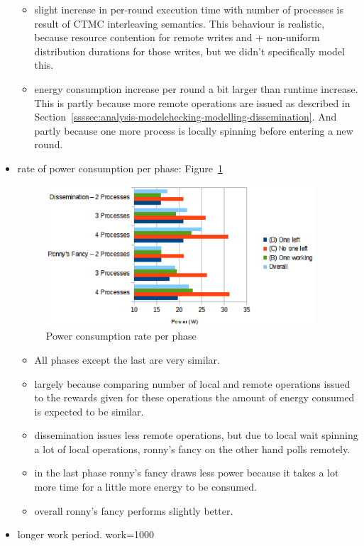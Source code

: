\documentclass[a4paper, 10pt]{article}
\begin{document}
\begin{itemize}
\begin{itemize}
			\item slight increase in per-round execution time with number of processes is result of CTMC interleaving semantics. This behaviour is realistic, because resource contention for remote writes and + non-uniform distribution durations for those writes, but we didn't specifically model this.
			\item energy consumption increase per round a bit larger than runtime increase. This is partly because more remote operations are issued as described in Section~\ref{ssssec:analysis-modelchecking-modelling-dissemination}. And partly because one more process is locally spinning before entering a new round.
		\end{itemize}
	\item rate of power consumption per phase: Figure~\ref{fig:df-power-work-100}
		\begin{figure}[htbp]
			\centering
			\includegraphics[width=10cm]{charts/df-power-work-100}
			\caption{Power consumption rate per phase}
			\label{fig:df-power-work-100}
		\end{figure}
		\begin{itemize}
			\item All phases except the last are very similar.
			\item largely because comparing number of local and remote operations issued to the rewards given for these operations the amount of energy consumed is expected to be similar.
			\item dissemination issues less remote operations, but due to local wait spinning a lot of local operations, ronny's fancy on the other hand polls remotely.
			\item in the last phase ronny's fancy draws less power because it takes a lot more time for a little more energy to be consumed.
			\item overall ronny's fancy performs slightly better.
		\end{itemize}
	\item longer work period. work=1000

\end{itemize}
\end{document}
